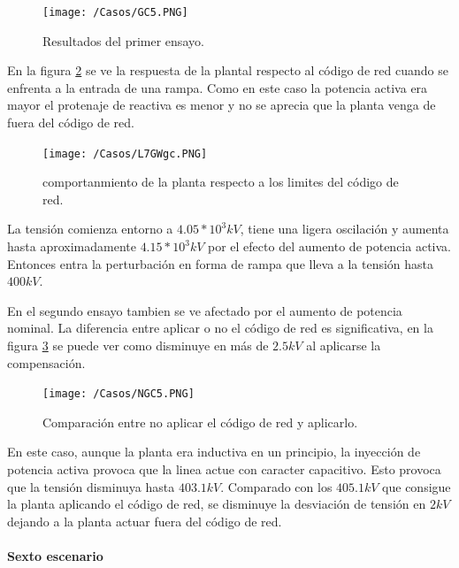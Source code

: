 \documentclass{book}
\begin{document}
\begin{figure}[h!]
\centering
\texttt{[image: /Casos/GC5.PNG]}
\caption{Resultados del primer ensayo. }
\label{GC5}
\end{figure} \par

En la figura \ref{L7GWgc} se ve la respuesta de la plantal respecto al c\'odigo de red cuando se enfrenta a la entrada de una rampa. Como en este caso la potencia activa era mayor el protenaje de reactiva es menor y no se aprecia que la planta venga de fuera del c\'odigo de red. \par
 
\begin{figure}[h!]
\centering
\texttt{[image: /Casos/L7GWgc.PNG]}
\caption{comportanmiento de la planta respecto a los limites del c\'odigo de red. }
\label{L7GWgc}
\end{figure} \par

La tensi\'on comienza entorno a $4.05 * 10^3 kV$, tiene una ligera oscilaci\'on y aumenta hasta aproximadamente $4.15* 10^3 kV$ por el efecto del aumento de potencia activa. Entonces entra la perturbaci\'on en forma de rampa que lleva a la tensi\'on hasta $400 kV$. 

En el segundo ensayo tambien se ve afectado por el aumento de potencia nominal. La diferencia entre aplicar o no el c\'odigo de red es significativa, en la figura \ref{NGC5} se puede ver como disminuye en m\'as de $2.5kV$ al aplicarse  la compensaci\'on. \par

\begin{figure}[h!]
\centering
\texttt{[image: /Casos/NGC5.PNG]}
\caption{Comparaci\'on entre no aplicar el c\'odigo de red y aplicarlo. }
\label{NGC5}
\end{figure} \par

En este caso, aunque la planta era inductiva en un principio, la inyecci\'on de potencia activa provoca que la linea actue con caracter capacitivo. Esto provoca que la tensi\'on disminuya hasta $403.1 kV$. Comparado con los $405.1 kV$ que consigue la planta aplicando el c\'odigo de red, se disminuye la desviaci\'on de tensi\'on en $2kV$ dejando a la planta actuar fuera del c\'odigo de red. 

	\paragraph{Sexto escenario}
\end{document}
